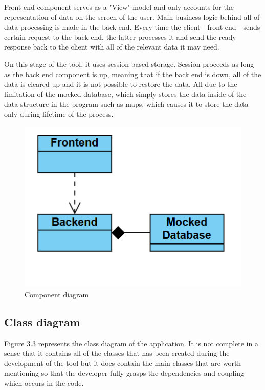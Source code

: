 Front end component serves as a "View" model and only accounts for the representation of data on the screen of the user. Main business logic behind all of data processing is made in the back end. Every time the client - front end - sends certain request to the back end, the latter processes it and send the ready response back to the client with all of the relevant data it may need. 

On this stage of the tool, it uses session-based storage. Session proceeds as long as the back end component is up, meaning that if the back end is down, all of the data is cleared up and it is not possible to restore the data. All due to the limitation of the mocked database, which simply stores the data inside of the data structure in the program such as maps, which causes it to store the data only during lifetime of the process.

\begin{figure}[H]
	\centering
	\includegraphics[width=\textwidth]{images/component_diagram.png}
	\caption{Component diagram}
\end{figure}

\subsection{Class diagram}

Figure 3.3 represents the class diagram of the application. It is not complete in a sense that it contains all of the classes that has been created during the development of the tool but it does contain the main classes that are worth mentioning so that the developer fully grasps the dependencies and coupling which occurs in the code.


